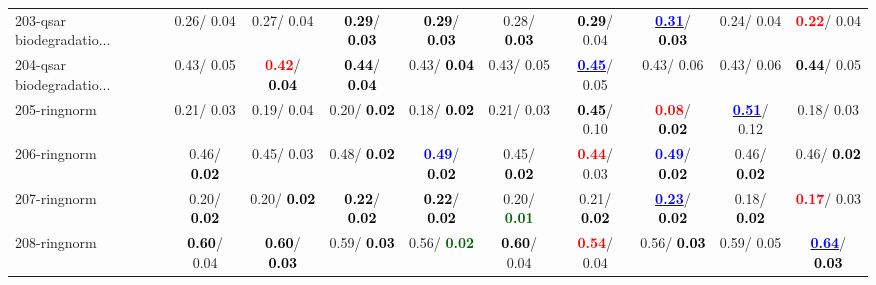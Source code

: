 \begin{table}[h]
\begin{center}
{\begin{tabular}{lc|c|c|c|c|c|c|c|c}
203-qsar biodegradatio... &   0.26/  0.04 &   0.27/  0.04 & \textcolor{black}{\textbf{  0.29}}/\textcolor{black}{\textbf{  0.03}} & \textcolor{black}{\textbf{  0.29}}/\textcolor{black}{\textbf{  0.03}} &   0.28/\textcolor{black}{\textbf{  0.03}} & \textcolor{black}{\textbf{  0.29}}/  0.04 & \underline{\textcolor{blue}{\textbf{  0.31}}}/\textcolor{black}{\textbf{  0.03}} &   0.24/  0.04 & \textcolor{red}{\textbf{  0.22}}/  0.04 \\
204-qsar biodegradatio... &   0.43/  0.05 & \textcolor{red}{\textbf{  0.42}}/\textcolor{black}{\textbf{  0.04}} & \textcolor{black}{\textbf{  0.44}}/\textcolor{black}{\textbf{  0.04}} &   0.43/\textcolor{black}{\textbf{  0.04}} &   0.43/  0.05 & \underline{\textcolor{blue}{\textbf{  0.45}}}/  0.05 &   0.43/  0.06 &   0.43/  0.06 & \textcolor{black}{\textbf{  0.44}}/  0.05 \\
205-ringnorm &   0.21/  0.03 &   0.19/  0.04 &   0.20/\textcolor{black}{\textbf{  0.02}} &   0.18/\textcolor{black}{\textbf{  0.02}} &   0.21/  0.03 & \textcolor{black}{\textbf{  0.45}}/  0.10 & \textcolor{red}{\textbf{  0.08}}/\textcolor{black}{\textbf{  0.02}} & \underline{\textcolor{blue}{\textbf{  0.51}}}/  0.12 &   0.18/  0.03 \\
206-ringnorm &   0.46/\textcolor{black}{\textbf{  0.02}} &   0.45/  0.03 &   0.48/\textcolor{black}{\textbf{  0.02}} & \textcolor{blue}{\textbf{  0.49}}/\textcolor{black}{\textbf{  0.02}} &   0.45/\textcolor{black}{\textbf{  0.02}} & \textcolor{red}{\textbf{  0.44}}/  0.03 & \textcolor{blue}{\textbf{  0.49}}/\textcolor{black}{\textbf{  0.02}} &   0.46/\textcolor{black}{\textbf{  0.02}} &   0.46/\textcolor{black}{\textbf{  0.02}} \\ \hline
207-ringnorm &   0.20/\textcolor{black}{\textbf{  0.02}} &   0.20/\textcolor{black}{\textbf{  0.02}} & \textcolor{black}{\textbf{  0.22}}/\textcolor{black}{\textbf{  0.02}} & \textcolor{black}{\textbf{  0.22}}/\textcolor{black}{\textbf{  0.02}} &   0.20/\textcolor{darkgreen}{\textbf{  0.01}} &   0.21/\textcolor{black}{\textbf{  0.02}} & \underline{\textcolor{blue}{\textbf{  0.23}}}/\textcolor{black}{\textbf{  0.02}} &   0.18/\textcolor{black}{\textbf{  0.02}} & \textcolor{red}{\textbf{  0.17}}/  0.03 \\
208-ringnorm & \textcolor{black}{\textbf{  0.60}}/  0.04 & \textcolor{black}{\textbf{  0.60}}/\textcolor{black}{\textbf{  0.03}} &   0.59/\textcolor{black}{\textbf{  0.03}} &   0.56/\textcolor{darkgreen}{\textbf{  0.02}} & \textcolor{black}{\textbf{  0.60}}/  0.04 & \textcolor{red}{\textbf{  0.54}}/  0.04 &   0.56/\textcolor{black}{\textbf{  0.03}} &   0.59/  0.05 & \underline{\textcolor{blue}{\textbf{  0.64}}}/\textcolor{black}{\textbf{  0.03}} \\

\end{tabular}}
\end{center}
\end{table}
